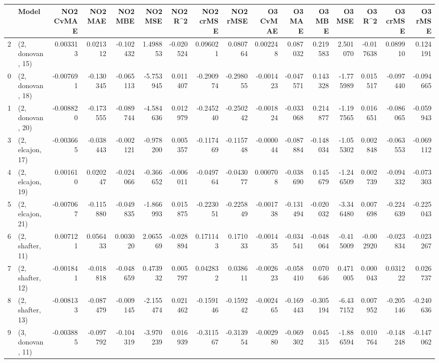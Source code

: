 \begin{tabular}{llrrrrrrrrrrrrrr}
\toprule
{} &             Model &  NO2 CvMAE &   NO2 MAE &   NO2 MBE &    NO2 MSE &   NO2 R\textasciicircum2 &  NO2 crMSE &  NO2 rMSE &  O3 CvMAE &    O3 MAE &    O3 MBE &     O3 MSE &    O3 R\textasciicircum2 &  O3 crMSE &   O3 rMSE \\
\midrule
2  &  (2, donovan, 15) &   0.003313 &  0.021312 & -0.102432 &   1.498853 & -0.020524 &   0.096021 &  0.080764 &  0.002248 &  0.087032 &  0.219583 &   2.501070 & -0.017638 &  0.089910 &  0.124191 \\
0  &  (2, donovan, 18) &  -0.007691 & -0.130345 & -0.065113 &  -5.753945 &  0.011407 &  -0.290974 & -0.298055 & -0.001423 & -0.047571 &  0.143328 &  -1.775989 &  0.015517 & -0.097440 & -0.094665 \\
1  &  (2, donovan, 20) &  -0.008820 & -0.173555 & -0.089744 &  -4.584636 &  0.012979 &  -0.245240 & -0.250242 & -0.001824 & -0.033068 &  0.214877 &  -1.197565 &  0.016651 & -0.086065 & -0.059943 \\
3  &  (2, elcajon, 17) &  -0.003665 & -0.038443 & -0.002121 &  -0.978200 &  0.005357 &  -0.117469 & -0.115748 & -0.000044 & -0.087884 & -0.148034 &  -1.055302 &  0.002848 & -0.063553 & -0.069112 \\
4  &  (2, elcajon, 19) &   0.001610 &  0.020247 & -0.024066 &  -0.366652 & -0.006011 &  -0.049764 & -0.043077 &  0.000708 & -0.038690 &  0.145679 &  -1.246509 &  0.002739 & -0.094332 & -0.073303 \\
5  &  (2, elcajon, 21) &  -0.007067 & -0.115880 & -0.049835 &  -1.866993 &  0.015875 &  -0.223051 & -0.225849 & -0.001738 & -0.131494 & -0.020032 &  -3.346480 &  0.007698 & -0.224639 & -0.225043 \\
6  &  (2, shafter, 11) &   0.007121 &  0.056433 &  0.003020 &   2.065569 & -0.028894 &   0.171143 &  0.171033 & -0.001435 & -0.034541 & -0.048064 &  -0.415009 & -0.002920 & -0.023834 & -0.023267 \\
7  &  (2, shafter, 12) &  -0.001841 & -0.018818 & -0.048659 &   0.473932 &  0.005797 &   0.042832 &  0.038611 & -0.002623 & -0.058410 &  0.070646 &   0.471005 &  0.000043 &  0.031222 &  0.026737 \\
8  &  (2, shafter, 13) &  -0.008133 & -0.087479 & -0.009145 &  -2.155474 &  0.021462 &  -0.159146 & -0.159242 & -0.002465 & -0.169443 & -0.305194 &  -6.437152 &  0.007952 & -0.205146 & -0.240636 \\
9  &  (3, donovan, 11) &  -0.003885 & -0.097792 & -0.104319 &  -3.970239 &  0.016939 &  -0.311567 & -0.313954 & -0.002980 & -0.069302 &  0.045315 &  -1.886594 &  0.010764 & -0.148248 & -0.147062 \\

\end{tabular}

